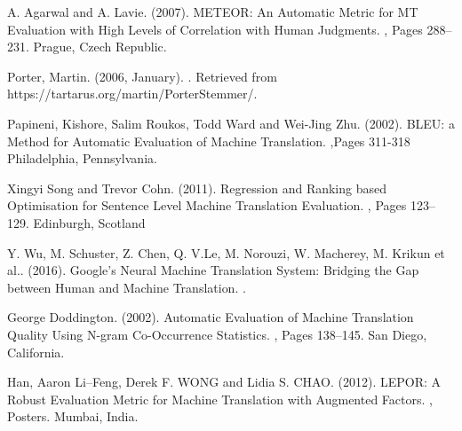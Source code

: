 \documentclass[11pt]{article}
\begin{document}
\begin{thebibliography}{}
A. Agarwal and A. Lavie.
\newblock (2007).
\newblock METEOR: An Automatic Metric for MT Evaluation with High Levels of Correlation with Human Judgments.
, Pages 288--231.
\newblock Prague, Czech Republic.

Porter, Martin.
\newblock (2006, January).
.
\newblock Retrieved from https://tartarus.org/martin/PorterStemmer/.

Papineni, Kishore, Salim Roukos, Todd Ward and Wei-Jing Zhu.
\newblock (2002).
\newblock BLEU: a Method for Automatic Evaluation of Machine Translation.
,Pages 311-318
\newblock Philadelphia, Pennsylvania.

Xingyi Song and Trevor Cohn.
\newblock (2011).
\newblock Regression and Ranking based Optimisation for Sentence Level Machine Translation Evaluation.
, Pages 123--129.
\newblock Edinburgh, Scotland

Y. Wu, M. Schuster, Z. Chen, Q. V.Le, M. Norouzi, W. Macherey, M. Krikun \bgroup et al.\egroup.
\newblock (2016).
\newblock Google's Neural Machine Translation System: Bridging the Gap between Human and Machine Translation.
.
\newblock

George Doddington.
\newblock (2002).
\newblock Automatic Evaluation of Machine Translation Quality Using N-gram Co-Occurrence Statistics.
, Pages 138--145.
\newblock San Diego, California.





Han, Aaron Li--Feng, Derek F. WONG and Lidia S. CHAO.
\newblock (2012).
\newblock LEPOR: A Robust Evaluation Metric for Machine Translation with Augmented Factors.
, Posters.
\newblock Mumbai, India.


\end{thebibliography}
\end{document}
